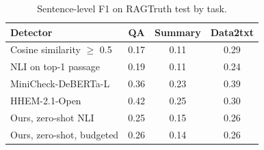 \begin{table}[t]
\centering\small
\begin{tabular}{lccc}
\toprule
Detector & QA & Summary & Data2txt \\
\midrule
Cosine similarity $\geq$ 0.5 & 0.17 & 0.11 & 0.29 \\
NLI on top-1 passage & 0.19 & 0.11 & 0.24 \\
MiniCheck-DeBERTa-L & 0.36 & 0.23 & 0.39 \\
HHEM-2.1-Open & 0.42 & 0.25 & 0.30 \\
Ours, zero-shot NLI & 0.25 & 0.15 & 0.26 \\
Ours, zero-shot, budgeted & 0.26 & 0.14 & 0.26 \\
\bottomrule
\end{tabular}
\caption{Sentence-level F1 on RAGTruth test by task.}
\label{tab:ragtruth-tasks}
\end{table}

